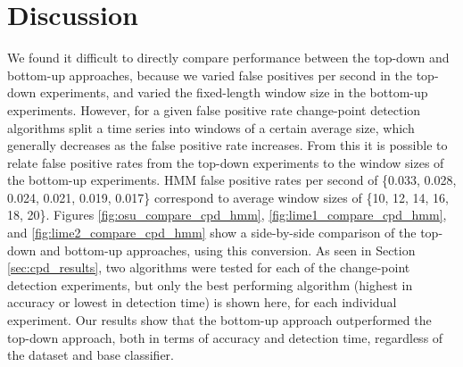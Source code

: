 
\newpage

\section{Discussion}

We found it difficult to directly compare performance between the
top-down and bottom-up approaches, because we
varied false positives per second in the top-down experiments,
and varied the fixed-length window size in the bottom-up experiments.
However, for a given false positive rate change-point
detection algorithms split a time series into windows of a certain average size,
which generally decreases as the false positive rate increases. From this it is possible
to relate false positive rates from the top-down experiments to
the window sizes of the bottom-up experiments. HMM false positive rates per second of
\{0.033, 0.028, 0.024, 0.021, 0.019, 0.017\} correspond to average
window sizes of \{10, 12, 14, 16, 18, 20\}. Figures \ref{fig:osu_compare_cpd_hmm},
\ref{fig:lime1_compare_cpd_hmm}, and \ref{fig:lime2_compare_cpd_hmm}
show a side-by-side comparison of the top-down and bottom-up approaches, using
this conversion. As seen in Section \ref{sec:cpd_results}, two algorithms 
were tested for each of the change-point detection experiments, but only the
best performing algorithm (highest in accuracy or lowest in detection time) is 
shown here, for each individual experiment.
Our results show that the bottom-up approach outperformed the top-down
approach, both in terms of accuracy
and detection time, regardless of the dataset and base classifier.

